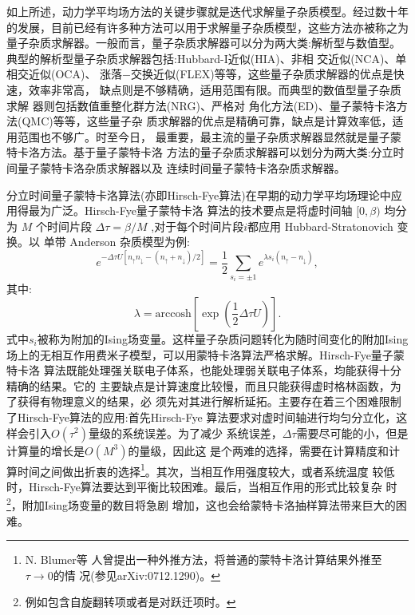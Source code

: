 如上所述，动力学平均场方法的关键步骤就是迭代求解量子杂质模型。经过数十年
的发展，目前已经有许多种方法可以用于求解量子杂质模型，这些方法亦被称之为
量子杂质求解器。一般而言，量子杂质求解器可以分为两大类:解析型与数值型。
典型的解析型量子杂质求解器包括:Hubbard-I近似(HIA)\cite{hubbard:1964}、非相
交近似(NCA)\cite{bickers:1987}、单相交近似(OCA)\cite{pruschke:1989,haule:2001}、
涨落$-$交换近似(FLEX)等等，这些量子杂质求解器的优点是快速，效率非常高，
缺点则是不够精确，适用范围有限。而典型的数值型量子杂质求解
器则包括数值重整化群方法(NRG)\cite{wilson:773,white:2863,scholl:259}、严格对
角化方法(ED)\cite{caffarel:1545}、量子蒙特卡洛方法(QMC)等等，这些量子杂
质求解器的优点是精确可靠，缺点是计算效率低，适用范围也不够广。时至今日，
最重要，最主流的量子杂质求解器显然就是量子蒙特卡洛方法。基于量子蒙特卡洛
方法的量子杂质求解器可以划分为两大类:分立时间量子蒙特卡洛杂质求解器以及
连续时间量子蒙特卡洛杂质求解器。

分立时间量子蒙特卡洛算法(亦即Hirsch-Fye算法)\cite{hirsch:2521,jarrell:1992,
sakai:155102}在早期的动力学平均场理论中应用得最为广泛。Hirsch-Fye量子蒙特卡洛
算法的技术要点是将虚时间轴 $[0, \beta)$ 均分为 $M$ 个时间片段 $\Delta 
\tau = \beta/M$ ,对于每个时间片段$i$都应用 Hubbard-Stratonovich 变换。以
单带 Anderson 杂质模型为例:
\begin{equation}
e^{-\Delta \tau U [n_{\uparrow}n_{\downarrow} - (n_{\uparrow}+n_{\downarrow})/2]}
=\frac{1}{2}\sum_{s_i = \pm 1} e^{\lambda s_i (n_{\uparrow} -n_{\downarrow} )},
\end{equation}
其中:
\begin{equation}
\lambda = \text{arccosh}\left[\exp\left(\frac{1}{2}\Delta \tau U\right)\right].
\end{equation}
式中${s_i}$被称为附加的Ising场变量。这样量子杂质问题转化为随时间变化的附加Ising
场上的无相互作用费米子模型，可以用蒙特卡洛算法严格求解。Hirsch-Fye量子蒙特卡洛
算法既能处理强关联电子体系，也能处理弱关联电子体系，均能获得十分精确的结果。它的
主要缺点是计算速度比较慢，而且只能获得虚时格林函数，为了获得有物理意义的结果，必
须先对其进行解析延拓。主要存在着三个困难限制了Hirsch-Fye算法的应用:首先Hirsch-Fye
算法要求对虚时间轴进行均匀分立化，这样会引入$O(\tau^2)$量级的系统误差。为了减少
系统误差，$\Delta \tau$需要尽可能的小，但是计算量的增长是$O(M^3)$的量级，因此这
是个两难的选择，需要在计算精度和计算时间之间做出折衷的选择\footnote{N. Blumer等
人曾提出一种外推方法，将普通的蒙特卡洛计算结果外推至$\tau \rightarrow 0$的情
况(参见{\color{red}arXiv:0712.1290})。}。其次，当相互作用强度较大，或者系统温度
较低时，Hirsch-Fye算法要达到平衡比较困难。最后，当相互作用的形式比较复杂
时\footnote{例如包含自旋翻转项或者是对跃迁项时。}，附加Ising场变量的数目将急剧
增加，这也会给蒙特卡洛抽样算法带来巨大的困难\cite{sakai:155102}。

